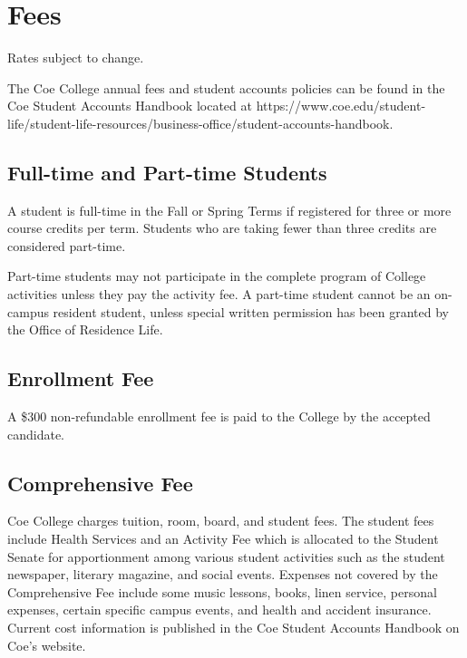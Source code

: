 \documentclass[
  letterpaper,
]{scrbook}
\begin{document}
\section{Fees}\label{fees}

Rates subject to change.

The Coe College annual fees and student accounts policies can be found
in the Coe Student Accounts Handbook located at
https://www.coe.edu/student-life/student-life-resources/business-office/student-accounts-handbook.

\subsection{Full-time and Part-time
Students}\label{full-time-and-part-time-students}

A student is full-time in the Fall or Spring Terms if registered for
three or more course credits per term. Students who are taking fewer
than three credits are considered part-time.

Part-time students may not participate in the complete program of
College activities unless they pay the activity fee. A part-time student
cannot be an on-campus resident student, unless special written
permission has been granted by the Office of Residence Life.

\subsection{Enrollment Fee}\label{enrollment-fee}

A \$300 non-refundable enrollment fee is paid to the College by the
accepted candidate.

\subsection{Comprehensive Fee}\label{comprehensive-fee}

Coe College charges tuition, room, board, and student fees. The student
fees include Health Services and an Activity Fee which is allocated to
the Student Senate for apportionment among various student activities
such as the student newspaper, literary magazine, and social events.
Expenses not covered by the Comprehensive Fee include some music
lessons, books, linen service, personal expenses, certain specific
campus events, and health and accident insurance. Current cost
information is published in the Coe Student Accounts Handbook on Coe's
website.
\end{document}
